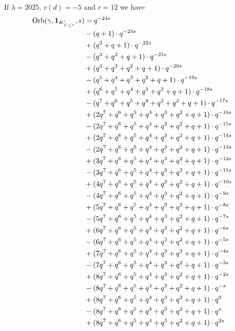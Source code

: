 \begin{example}
  If $\lambda = 2025$, $v(d) = -5$ and $r = 12$ we have
  \begin{align*}
    \Orb(\gamma, \mathbf{1}_{K'_{S, \le r}}, s)
    &= q^{-24s} \\
    &- (q+1) \cdot q^{-23s} \\
    &+ (q^2+q+1) \cdot q^{-22s} \\
    &- (q^3+q^2+q+1) \cdot q^{-21s} \\
    &+ (q^4+q^3+q^2+q+1) \cdot q^{-20s} \\
    &- (q^5+q^4+q^3+q^2+q+1) \cdot q^{-19s} \\
    &+ (q^6+q^5+q^4+q^3+q^2+q+1) \cdot q^{-18s} \\
    &- (q^7+q^6+q^5+q^4+q^3+q^2+q+1) \cdot q^{-17s} \\
    &+ (2q^7+q^6+q^5+q^4+q^3+q^2+q+1) \cdot q^{-16s} \\
    &- (2q^7+q^6+q^5+q^4+q^3+q^2+q+1) \cdot q^{-15s} \\
    &+ (2q^7+q^6+q^5+q^4+q^3+q^2+q+1) \cdot q^{-14s} \\
    &- (2q^7+q^6+q^5+q^4+q^3+q^2+q+1) \cdot q^{-13s} \\
    &+ (3q^7+q^6+q^5+q^4+q^3+q^2+q+1) \cdot q^{-12s} \\
    &- (3q^7+q^6+q^5+q^4+q^3+q^2+q+1) \cdot q^{-11s} \\
    &+ (4q^7+q^6+q^5+q^4+q^3+q^2+q+1) \cdot q^{-10s} \\
    &- (4q^7+q^6+q^5+q^4+q^3+q^2+q+1) \cdot q^{-9s} \\
    &+ (5q^7+q^6+q^5+q^4+q^3+q^2+q+1) \cdot q^{-8s} \\
    &- (5q^7+q^6+q^5+q^4+q^3+q^2+q+1) \cdot q^{-7s} \\
    &+ (6q^7+q^6+q^5+q^4+q^3+q^2+q+1) \cdot q^{-6s} \\
    &- (6q^7+q^6+q^5+q^4+q^3+q^2+q+1) \cdot q^{-5s} \\
    &+ (7q^7+q^6+q^5+q^4+q^3+q^2+q+1) \cdot q^{-4s} \\
    &- (7q^7+q^6+q^5+q^4+q^3+q^2+q+1) \cdot q^{-3s} \\
    &+ (8q^7+q^6+q^5+q^4+q^3+q^2+q+1) \cdot q^{-2s} \\
    &- (8q^7+q^6+q^5+q^4+q^3+q^2+q+1) \cdot q^{-s} \\
    &+ (8q^7+q^6+q^5+q^4+q^3+q^2+q+1) \cdot q^{0} \\
    &- (8q^7+q^6+q^5+q^4+q^3+q^2+q+1) \cdot q^{s} \\
    &+ (8q^7+q^6+q^5+q^4+q^3+q^2+q+1) \cdot q^{2s} \\

\end{align*}
\end{example}
